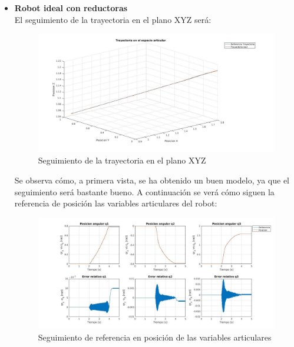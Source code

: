 \begin{itemize}

	\item \textbf{Robot ideal con reductoras} \\

	El seguimiento de la trayectoria en el plano XYZ será:

	\begin{figure}[h!]

		\centering

		\includegraphics[width=.8\textwidth]{exp3_trayPDideal}

		\caption{Seguimiento de la trayectoria en el plano XYZ}

	\end{figure}



	Se observa cómo, a primera vista, se ha obtenido un buen modelo, ya que el seguimiento será bastante bueno. A continuación se verá cómo siguen la referencia de posición las variables articulares del robot:

\newpage

	\begin{figure}[h!]

		\centering

		\includegraphics[width=.8\textwidth]{exp3_posPDidealCR}

		\caption{Seguimiento de referencia en posición de las variables articulares}

	\end{figure}






\end{itemize}
